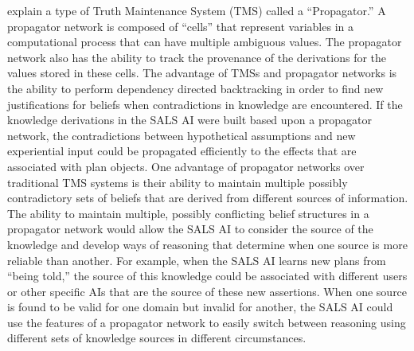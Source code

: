 \cite{radul:2009} explain a type of Truth Maintenance System (TMS)
\cite[]{doyle:1978} called a ``Propagator.''  A propagator network is
composed of ``cells'' that represent variables in a computational
process that can have multiple ambiguous values.  The propagator
network also has the ability to track the provenance of the
derivations for the values stored in these cells.  The advantage of
TMSs and propagator networks is the ability to perform dependency
directed backtracking in order to find new justifications for beliefs
when contradictions in knowledge are encountered.  If the knowledge
derivations in the SALS AI were built based upon a propagator network,
the contradictions between hypothetical assumptions and new
experiential input could be propagated efficiently to the effects that
are associated with plan objects.  One advantage of propagator
networks over traditional TMS systems is their ability to maintain
multiple possibly contradictory sets of beliefs that are derived from
different sources of information.  The ability to maintain multiple,
possibly conflicting belief structures in a propagator network would
allow the SALS AI to consider the source of the knowledge and develop
ways of reasoning that determine when one source is more reliable than
another.  For example, when the SALS AI learns new plans from ``being
told,'' the source of this knowledge could be associated with
different users or other specific AIs that are the source of these new
assertions.  When one source is found to be valid for one domain but
invalid for another, the SALS AI could use the features of a
propagator network to easily switch between reasoning using different
sets of knowledge sources in different circumstances.



